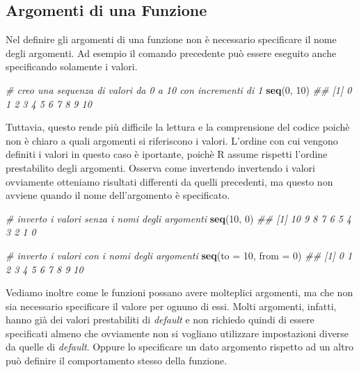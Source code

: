 \documentclass[
]{book}
\newenvironment{Shaded}{\begin{snugshade}}{\end{snugshade}}
\newcommand{\CommentTok}[1]{\textcolor[rgb]{0.56,0.35,0.01}{\textit{#1}}}
\newcommand{\DataTypeTok}[1]{\textcolor[rgb]{0.13,0.29,0.53}{#1}}
\newcommand{\DecValTok}[1]{\textcolor[rgb]{0.00,0.00,0.81}{#1}}
\newcommand{\KeywordTok}[1]{\textcolor[rgb]{0.13,0.29,0.53}{\textbf{#1}}}
\newcommand{\NormalTok}[1]{#1}
\begin{document}
\hypertarget{function-arguments}{%
\subsection{Argomenti di una Funzione}\label{function-arguments}}

Nel definire gli argomenti di una funzione non è necessario specificare il nome degli argomenti. Ad esempio il comando precedente può essere eseguito anche specificando solamente i valori.

\begin{Shaded}
\begin{Highlighting}[]
\CommentTok{# creo una sequenza di valori da 0 a 10 con incrementi di 1}
\KeywordTok{seq}\NormalTok{(}\DecValTok{0}\NormalTok{, }\DecValTok{10}\NormalTok{)}
\CommentTok{##  [1]  0  1  2  3  4  5  6  7  8  9 10}
\end{Highlighting}
\end{Shaded}

Tuttavia, questo rende più difficile la lettura e la comprensione del codice poichè non è chiaro a quali argomenti si riferiscono i valori. L'ordine con cui vengono definiti i valori in questo caso è iportante, poichè R assume rispetti l'ordine prestabilito degli argomenti. Osserva come invertendo invertendo i valori ovviamente otteniamo risultati differenti da quelli precedenti, ma questo non avviene quando il nome dell'argomento è specificato.

\begin{Shaded}
\begin{Highlighting}[]
\CommentTok{# inverto i valori senza i nomi degli argomenti}
\KeywordTok{seq}\NormalTok{(}\DecValTok{10}\NormalTok{, }\DecValTok{0}\NormalTok{)}
\CommentTok{##  [1] 10  9  8  7  6  5  4  3  2  1  0}

\CommentTok{# inverto i valori con i nomi degli argomenti}
\KeywordTok{seq}\NormalTok{(}\DataTypeTok{to =} \DecValTok{10}\NormalTok{, }\DataTypeTok{from =} \DecValTok{0}\NormalTok{)}
\CommentTok{##  [1]  0  1  2  3  4  5  6  7  8  9 10}
\end{Highlighting}
\end{Shaded}

Vediamo inoltre come le funzioni possano avere molteplici argomenti, ma che non sia necessario specificare il valore per ognuno di essi. Molti argomenti, infatti, hanno già dei valori prestabiliti di \emph{default} e non richiedo quindi di essere specificati almeno che ovviamente non si vogliano utilizzare impostazioni diverse da quelle di \emph{default}. Oppure lo specificare un dato argomento rispetto ad un altro può definire il comportamento stesso della funzione.
\end{document}

